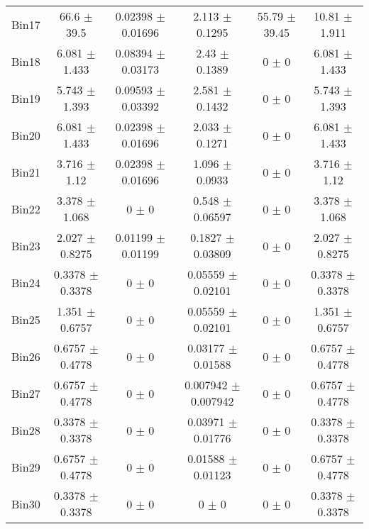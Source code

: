 \begin{tabular}{@{\extracolsep{4pt}}lccccc@{}}
     Bin17 & 66.6 $\pm$ 39.5 & 0.02398 $\pm$ 0.01696 & 2.113 $\pm$ 0.1295 & 55.79 $\pm$ 39.45 & 10.81 $\pm$ 1.911 \\ 
     Bin18 & 6.081 $\pm$ 1.433 & 0.08394 $\pm$ 0.03173 & 2.43 $\pm$ 0.1389 & 0 $\pm$ 0 & 6.081 $\pm$ 1.433 \\ 
     Bin19 & 5.743 $\pm$ 1.393 & 0.09593 $\pm$ 0.03392 & 2.581 $\pm$ 0.1432 & 0 $\pm$ 0 & 5.743 $\pm$ 1.393 \\ 
     Bin20 & 6.081 $\pm$ 1.433 & 0.02398 $\pm$ 0.01696 & 2.033 $\pm$ 0.1271 & 0 $\pm$ 0 & 6.081 $\pm$ 1.433 \\ 
     Bin21 & 3.716 $\pm$ 1.12 & 0.02398 $\pm$ 0.01696 & 1.096 $\pm$ 0.0933 & 0 $\pm$ 0 & 3.716 $\pm$ 1.12 \\ 
     Bin22 & 3.378 $\pm$ 1.068 & 0 $\pm$ 0 & 0.548 $\pm$ 0.06597 & 0 $\pm$ 0 & 3.378 $\pm$ 1.068 \\ 
     Bin23 & 2.027 $\pm$ 0.8275 & 0.01199 $\pm$ 0.01199 & 0.1827 $\pm$ 0.03809 & 0 $\pm$ 0 & 2.027 $\pm$ 0.8275 \\ 
     Bin24 & 0.3378 $\pm$ 0.3378 & 0 $\pm$ 0 & 0.05559 $\pm$ 0.02101 & 0 $\pm$ 0 & 0.3378 $\pm$ 0.3378 \\ 
     Bin25 & 1.351 $\pm$ 0.6757 & 0 $\pm$ 0 & 0.05559 $\pm$ 0.02101 & 0 $\pm$ 0 & 1.351 $\pm$ 0.6757 \\ 
     Bin26 & 0.6757 $\pm$ 0.4778 & 0 $\pm$ 0 & 0.03177 $\pm$ 0.01588 & 0 $\pm$ 0 & 0.6757 $\pm$ 0.4778 \\ 
     Bin27 & 0.6757 $\pm$ 0.4778 & 0 $\pm$ 0 & 0.007942 $\pm$ 0.007942 & 0 $\pm$ 0 & 0.6757 $\pm$ 0.4778 \\ 
     Bin28 & 0.3378 $\pm$ 0.3378 & 0 $\pm$ 0 & 0.03971 $\pm$ 0.01776 & 0 $\pm$ 0 & 0.3378 $\pm$ 0.3378 \\ 
     Bin29 & 0.6757 $\pm$ 0.4778 & 0 $\pm$ 0 & 0.01588 $\pm$ 0.01123 & 0 $\pm$ 0 & 0.6757 $\pm$ 0.4778 \\ 
     Bin30 & 0.3378 $\pm$ 0.3378 & 0 $\pm$ 0 & 0 $\pm$ 0 & 0 $\pm$ 0 & 0.3378 $\pm$ 0.3378 \\ 
\hline\hline
  \end{tabular}
